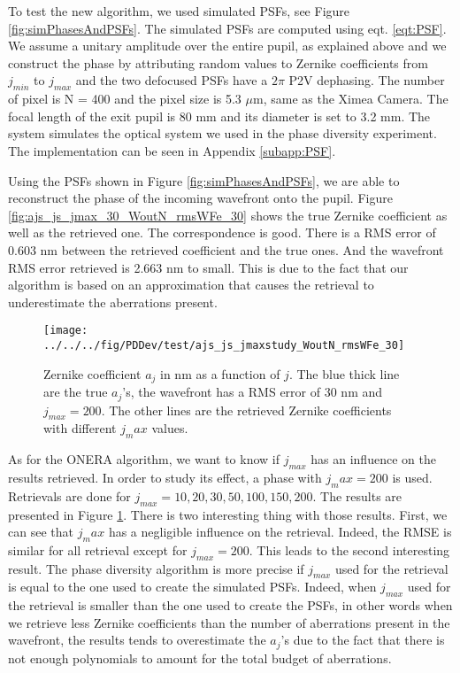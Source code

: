 To test the new algorithm, we used simulated PSFs, see Figure \ref{fig:simPhasesAndPSFs}. The simulated PSFs are computed using eqt. \eqref{eqt:PSF}. We assume a unitary amplitude over the entire pupil, as explained above and we construct the phase by attributing random values to Zernike coefficients from $j_{min}$ to $j_{max}$ and the two defocused PSFs have a $2\pi$ P2V dephasing. The number of pixel is N = 400 and the pixel size is 5.3 $\mu$m, same as the Ximea Camera. The focal length of the exit pupil is 80 mm and its diameter is set to 3.2 mm. The system simulates the optical system we used in the phase diversity experiment. The implementation can be seen in Appendix \ref{subapp:PSF}. 

Using the PSFs shown in Figure \ref{fig:simPhasesAndPSFs}, we are able to reconstruct the phase of the incoming wavefront onto the pupil. Figure \ref{fig:ajs_js_jmax_30_WoutN_rmsWFe_30} shows the true Zernike coefficient as well as the retrieved one. The correspondence is good. There is a RMS error of 0.603 nm between the retrieved coefficient and the true ones. And the wavefront RMS error retrieved is 2.663 nm to small. This is due to the fact that our algorithm is based on an approximation that causes the retrieval to underestimate the aberrations present.

\begin{figure}
\begin{center}
\texttt{[image: ../../../fig/PDDev/test/ajs\_js\_jmaxstudy\_WoutN\_rmsWFe\_30]}
\decoRule
\caption{Zernike coefficient $a_j$ in nm as a function of $j$. The blue thick line are the true $a_j$'s, the wavefront has a RMS error of 30 nm and $j_{max}= 200$. The other lines are the retrieved Zernike coefficients with different $j_max$ values.}
\label{fig:ajs_js_jmaxstudy_WoutN_rmsWFe_30}
\end{center}
\end{figure}

As for the ONERA algorithm, we want to know if $j_{max}$ has an influence on the results retrieved. In order to study its effect, a phase with $j_max = 200$ is used. Retrievals are done for $j_{max} = 10, 20 , 30, 50,100,150,200$. The results are presented in Figure \ref{fig:ajs_js_jmaxstudy_WoutN_rmsWFe_30}. There is two interesting thing with those results. First, we can see that $j_max$ has a negligible influence on the retrieval. Indeed, the RMSE is similar for all retrieval except for $j_{max} = 200$. This leads to the second interesting result. The phase diversity algorithm is more precise if $j_{max}$ used for the retrieval is equal to the one used to create the simulated PSFs. Indeed, when $j_{max}$ used for the retrieval is smaller than the one used to create the PSFs, in other words when we retrieve less Zernike coefficients than the number of aberrations present in the wavefront, the results tends to overestimate the $a_j$'s due to the fact that there is not enough polynomials to amount for the total budget of aberrations.

